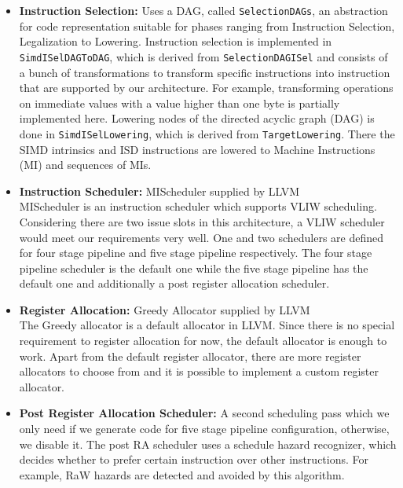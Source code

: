 \begin{itemize}
	\item \textbf{Instruction Selection:} Uses a DAG, called \texttt{SelectionDAGs}, an abstraction for code representation suitable for phases ranging from Instruction Selection, Legalization to Lowering. Instruction selection is implemented in  \texttt{SimdISelDAGToDAG}, which is derived from \texttt{SelectionDAGISel} and consists of a bunch of transformations to transform specific instructions into instruction that are supported by our architecture. For example, transforming operations on immediate values with a value higher than one byte is partially implemented here. Lowering nodes of the directed acyclic graph (DAG) is done in \texttt{SimdISelLowering}, which is derived from \texttt{TargetLowering}. There the SIMD intrinsics and ISD instructions are lowered to Machine Instructions (MI) and sequences of MIs.
	\item \textbf{Instruction Scheduler:} MIScheduler supplied by LLVM\\
MIScheduler is an instruction scheduler which supports VLIW scheduling. Considering there are two issue slots in this architecture, a VLIW scheduler would meet our requirements very well. One and two schedulers are defined for four stage pipeline and five stage pipeline respectively. The four stage pipeline scheduler is the default one while the five stage pipeline has the default one and additionally a post register allocation scheduler.
	\item \textbf{Register Allocation:} Greedy Allocator supplied by LLVM\\
	The Greedy allocator is a default allocator in LLVM. Since there is no special requirement to register allocation for now, the default allocator is enough to work. Apart from the default register allocator, there are more register allocators to choose from and it is possible to implement a custom register allocator.
	\item \textbf{Post Register Allocation Scheduler:} A second scheduling pass which we only need if we generate code for five stage pipeline configuration, otherwise, we disable it. The post RA scheduler uses a schedule hazard recognizer, which decides whether to prefer certain instruction over other instructions. For example, RaW hazards are detected and avoided by this algorithm.

\end{itemize}

